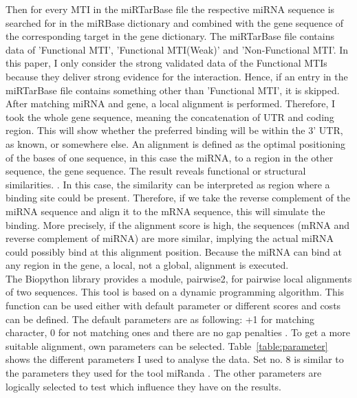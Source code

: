 \documentclass[11pt,  a4paper]{report}
\begin{document}
Then for every MTI in the miRTarBase file the respective miRNA sequence is searched for in the miRBase dictionary and combined with the gene sequence of the corresponding target in the gene dictionary. The miRTarBase file contains data of 'Functional MTI', 'Functional MTI(Weak)' and 'Non-Functional MTI'. In this paper, I only consider the strong validated data of the Functional MTIs because they deliver strong evidence for the interaction. Hence, if an entry in the miRTarBase file contains something other than 'Functional MTI', it is skipped. \\

After matching miRNA and gene, a local alignment is performed. Therefore, I took the whole gene sequence, meaning the concatenation of UTR and coding region. This will show whether the preferred binding will be within the 3' UTR, as known, or somewhere else. An alignment is defined as the optimal positioning of the bases of one sequence, in this case the miRNA, to a region in the other sequence, the gene sequence. The result reveals functional or structural similarities. \cite{alignment}. In this case, the similarity can be interpreted as region where a binding site could be present. Therefore, if we take the reverse complement of the miRNA sequence and align it to the mRNA sequence, this will simulate the binding. More precisely, if the alignment score is high, the sequences (mRNA and reverse complement of miRNA) are more similar, implying the actual miRNA could possibly bind at this alignment position. Because the miRNA can bind at any region in the gene, a local, not a global, alignment is executed.\\

The Biopython library provides a module, pairwise2, for pairwise local alignments of two sequences. This tool is based on a dynamic programming algorithm. This function can be used either with default parameter or different scores and costs can be defined. The default parameters are as following: +1 for matching character, 0 for not matching ones and there are no gap penalties \cite{pairwise}. To get a more suitable alignment, own parameters can be selected. Table~\ref{table:parameter} shows the different parameters I used to analyse the data. Set no. 8 is similar to the parameters they used for the tool miRanda \cite{Enright}. The other parameters are logically selected to test which influence they have on the results. \\
\end{document}
